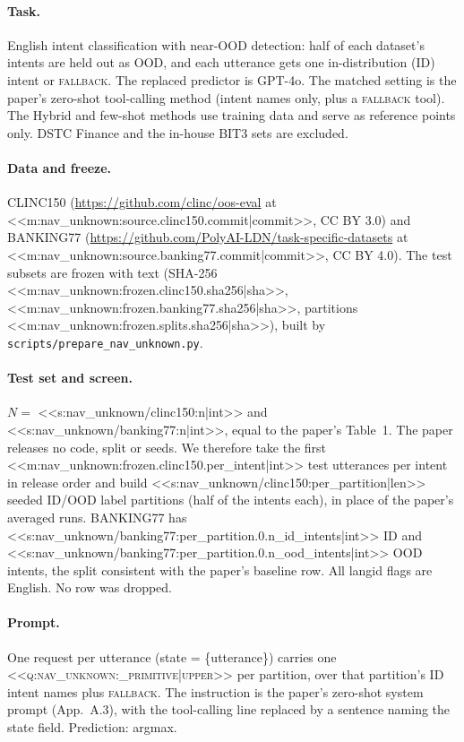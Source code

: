 \paragraph{Task.} English intent classification with near-OOD detection: half of each dataset's intents are held
out as OOD, and each utterance gets one in-distribution (ID) intent or \textsc{fallback}. The replaced predictor is
GPT-4o. The matched setting is the paper's zero-shot tool-calling method (intent names only, plus a
\textsc{fallback} tool). The Hybrid and few-shot methods use training data and serve as reference points only.
DSTC Finance and the in-house BIT3 sets are excluded.

\paragraph{Data and freeze.} CLINC150 (\url{https://github.com/clinc/oos-eval} at
<<m:nav_unknown:source.clinc150.commit|commit>>, CC BY 3.0) and BANKING77
(\url{https://github.com/PolyAI-LDN/task-specific-datasets} at <<m:nav_unknown:source.banking77.commit|commit>>,
CC BY 4.0). The test subsets are frozen with text (SHA-256 <<m:nav_unknown:frozen.clinc150.sha256|sha>>,
<<m:nav_unknown:frozen.banking77.sha256|sha>>, partitions <<m:nav_unknown:frozen.splits.sha256|sha>>), built by
\texttt{scripts/prepare\_nav\_unknown.py}.

\paragraph{Test set and screen.} $N=$ <<s:nav_unknown/clinc150:n|int>> and <<s:nav_unknown/banking77:n|int>>, equal
to the paper's Table~1. The paper releases no code, split or seeds. We therefore take the first
<<m:nav_unknown:frozen.clinc150.per_intent|int>> test utterances per intent in release order and build
<<s:nav_unknown/clinc150:per_partition|len>> seeded ID/OOD label partitions (half of the intents each), in place of the paper's averaged
runs. BANKING77 has <<s:nav_unknown/banking77:per_partition.0.n_id_intents|int>> ID and
<<s:nav_unknown/banking77:per_partition.0.n_ood_intents|int>> OOD intents, the split consistent with the paper's
baseline row. All langid flags are English. No row was dropped.

\paragraph{Prompt.} One request per utterance (state = \{utterance\}) carries one
\textsc{<<q:nav_unknown:_primitive|upper>>} per partition, over that partition's ID intent names plus
\textsc{fallback}. The instruction is the paper's zero-shot system prompt (App.~A.3), with the tool-calling line
replaced by a sentence naming the state field. Prediction: argmax.

